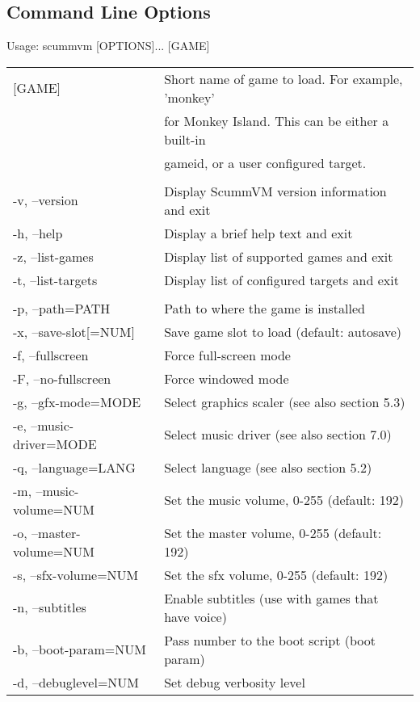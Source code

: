 \subsection{Command Line Options}

Usage: scummvm [OPTIONS]... [GAME]\\
\begin{tabular}{ll}
  [GAME]                  &Short name of game to load. For example, 'monkey'\\
                          &for Monkey Island. This can be either a built-in\\
                          &gameid, or a user configured target.\\
\\
  -v, --version           &Display ScummVM version information and exit\\
  -h, --help              &Display a brief help text and exit\\
  -z, --list-games        &Display list of supported games and exit\\
  -t, --list-targets      &Display list of configured targets and exit\\
\\
  -p, --path=PATH         &Path to where the game is installed\\
  -x, --save-slot[=NUM]   &Save game slot to load (default: autosave)\\
  -f, --fullscreen        &Force full-screen mode\\
  -F, --no-fullscreen     &Force windowed mode\\
  -g, --gfx-mode=MODE     &Select graphics scaler (see also section 5.3)\\
  -e, --music-driver=MODE &Select music driver (see also section 7.0)\\
  -q, --language=LANG     &Select language (see also section 5.2)\\
  -m, --music-volume=NUM  &Set the music volume, 0-255 (default: 192)\\
  -o, --master-volume=NUM &Set the master volume, 0-255 (default: 192)\\
  -s, --sfx-volume=NUM    &Set the sfx volume, 0-255 (default: 192)\\
  -n, --subtitles         &Enable subtitles (use with games that have voice)\\
  -b, --boot-param=NUM    &Pass number to the boot script (boot param)\\
  -d, --debuglevel=NUM    &Set debug verbosity level\\

\end{tabular}

